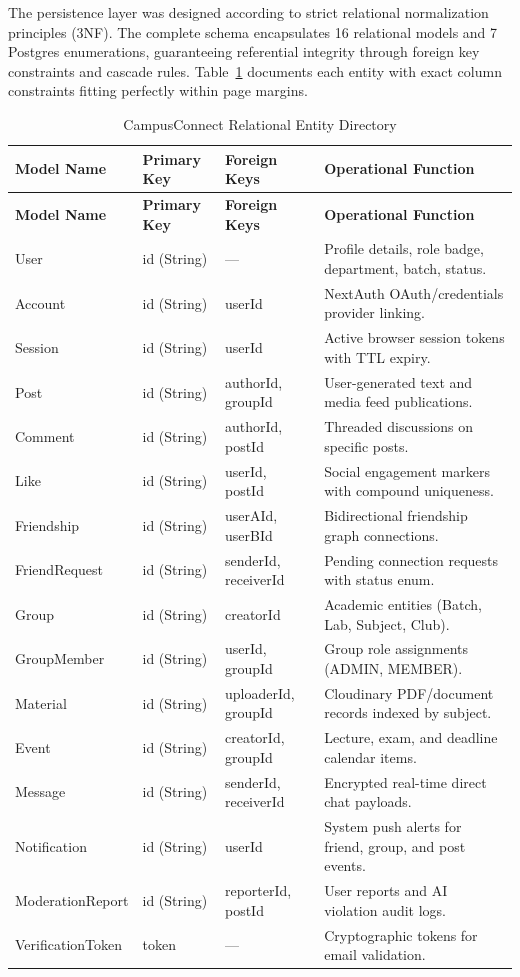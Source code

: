 \documentclass[11pt,a4paper]{report}
\begin{document}
The persistence layer was designed according to strict relational normalization principles (3NF). The complete schema encapsulates 16 relational models and 7 Postgres enumerations, guaranteeing referential integrity through foreign key constraints and cascade rules. Table~\ref{tab:entity-directory} documents each entity with exact column constraints fitting perfectly within page margins.

\begin{longtable}{@{}p{2.6cm}p{1.6cm}p{2.6cm}p{6.2cm}@{}}
\caption{CampusConnect Relational Entity Directory}\label{tab:entity-directory}\\
\toprule
\textbf{Model Name} & \textbf{Primary Key} & \textbf{Foreign Keys} & \textbf{Operational Function} \\
\midrule
\endfirsthead
\toprule
\textbf{Model Name} & \textbf{Primary Key} & \textbf{Foreign Keys} & \textbf{Operational Function} \\
\midrule
\endhead
\bottomrule
\endfoot
User & id (String) & --- & Profile details, role badge, department, batch, status. \\
Account & id (String) & userId & NextAuth OAuth/credentials provider linking. \\
Session & id (String) & userId & Active browser session tokens with TTL expiry. \\
Post & id (String) & authorId, groupId & User-generated text and media feed publications. \\
Comment & id (String) & authorId, postId & Threaded discussions on specific posts. \\
Like & id (String) & userId, postId & Social engagement markers with compound uniqueness. \\
Friendship & id (String) & userAId, userBId & Bidirectional friendship graph connections. \\
FriendRequest & id (String) & senderId, receiverId & Pending connection requests with status enum. \\
Group & id (String) & creatorId & Academic entities (Batch, Lab, Subject, Club). \\
GroupMember & id (String) & userId, groupId & Group role assignments (ADMIN, MEMBER). \\
Material & id (String) & uploaderId, groupId & Cloudinary PDF/document records indexed by subject. \\
Event & id (String) & creatorId, groupId & Lecture, exam, and deadline calendar items. \\
Message & id (String) & senderId, receiverId & Encrypted real-time direct chat payloads. \\
Notification & id (String) & userId & System push alerts for friend, group, and post events. \\
ModerationReport & id (String) & reporterId, postId & User reports and AI violation audit logs. \\
VerificationToken & token & --- & Cryptographic tokens for email validation. \\
\end{longtable}
\end{document}
